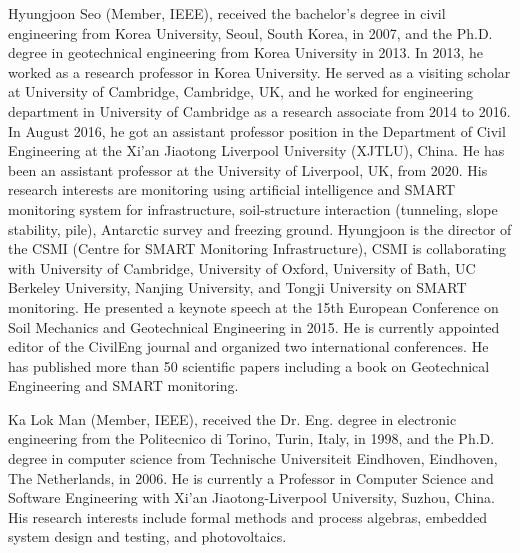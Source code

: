 \documentclass[lettersize,journal]{IEEEtran}
\begin{document}
\vspace{-1cm}
\begin{IEEEbiography}{Hyungjoon Seo} (Member, IEEE), received the bachelor's degree in civil engineering from Korea University, Seoul, South Korea, in 2007, and the Ph.D. degree in geotechnical engineering from Korea University in 2013. In 2013, he worked as a research professor in Korea University. He served as a visiting scholar at University of Cambridge, Cambridge, UK, and he worked for engineering department in University of Cambridge as a research associate from 2014 to 2016. In August 2016, he got an assistant professor position in the Department of Civil Engineering at the Xi'an Jiaotong Liverpool University (XJTLU), China. He has been an assistant professor at the University of Liverpool, UK, from 2020. His research interests are monitoring using artificial intelligence and SMART monitoring system for infrastructure, soil-structure interaction (tunneling, slope stability, pile), Antarctic survey and freezing ground. 
Hyungjoon is the director of the CSMI (Centre for SMART Monitoring Infrastructure), CSMI is collaborating with University of Cambridge, University of Oxford, University of Bath, UC Berkeley University, Nanjing University, and Tongji University on SMART monitoring. He presented a keynote speech at the 15th European Conference on Soil Mechanics and Geotechnical Engineering in 2015. He is currently appointed editor of the CivilEng journal and organized two international conferences. He has published more than 50 scientific papers including a book on Geotechnical Engineering and SMART monitoring. 
\end{IEEEbiography}
\vspace{-1cm}
\begin{IEEEbiography}{Ka Lok Man}
(Member, IEEE), received the Dr. Eng. degree in electronic engineering from the Politecnico di Torino, Turin, Italy, in 1998, and the Ph.D. degree in computer science from Technische Universiteit Eindhoven, Eindhoven, The Netherlands, in 2006. He is currently a Professor in Computer Science and Software Engineering with Xi'an Jiaotong-Liverpool University, Suzhou, China. His research interests include formal methods and process algebras, embedded system design and testing, and photovoltaics.
\end{IEEEbiography}
\vspace{-1cm}
\end{document}
